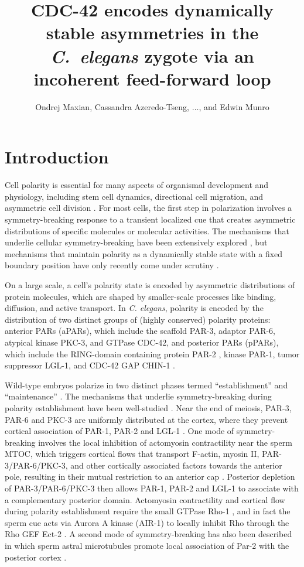 \documentclass[11pt]{article}
\title{CDC-42 encodes dynamically stable asymmetries in the \emph{C.\ elegans} zygote via an incoherent feed-forward loop}
\author{Ondrej Maxian, Cassandra Azeredo-Tseng, $\dots$, and Edwin Munro \vspace{-0.75 cm}}
\newcommand{\6}[1]{#1_{\text{6}}}
\newcommand{\3}[1]{#1_{\text{3}}}
\begin{document}
\maketitle

\section*{Introduction}
Cell polarity is essential for many aspects of organismal development and physiology, including stem cell dynamics, directional cell migration, and asymmetric cell division \citep{dewey2015cell, goldstein2007proteins, ierushalmi2021cytoskeletal, maitre2016asymmetric}. For most cells, the first step in polarization involves a symmetry-breaking response to a transient localized cue that creates asymmetric distributions of specific molecules or molecular activities. The mechanisms that underlie cellular symmetry-breaking have been extensively explored \citep{li2010symmetry}, but mechanisms that maintain polarity as a dynamically stable state with a fixed boundary position have only recently come under scrutiny \citep{sailer2015dynamic, gross2019guiding}.

On a large scale, a cell's polarity state is encoded by asymmetric distributions of protein molecules, which are shaped by smaller-scale processes like binding, diffusion, and active transport. In \emph{C. elegans}, polarity is encoded by the distribution of two distinct groups of (highly conserved) polarity proteins: anterior PARs (aPARs), which include the scaffold PAR-3, adaptor PAR-6, atypical kinase PKC-3, and GTPase CDC-42, and posterior PARs (pPARs), which include the RING-domain containing protein PAR-2 \citep{bland2023optimized}, kinase PAR-1, tumor suppressor LGL-1, and CDC-42 GAP CHIN-1 \citep{lang2017proteins}. 

Wild-type embryos polarize in two distinct phases termed ``establishment'' and ``maintenance'' \citep{cuenca2003polarization}. The mechanisms that underlie symmetry-breaking during polarity establishment have been well-studied \citep{cowan2007acto, munro2009cellular}.  Near the end of meiosis, PAR-3, PAR-6 and PKC-3 are uniformly distributed at the cortex, where they prevent cortical association of PAR-1, PAR-2 and LGL-1 \citep{schonegg2006cdc, others}.  One mode of symmetry-breaking involves the local inhibition of actomyosin contractility near the sperm MTOC, which triggers cortical flows that transport F-actin, myosin II, PAR-3/PAR-6/PKC-3, and other cortically associated factors towards the anterior pole, resulting in their mutual restriction to an anterior cap \citep{munro2004cortical, rodriguez2017apkc}. Posterior depletion of PAR-3/PAR-6/PKC-3 then allows PAR-1, PAR-2 and LGL-1 to associate with a complementary posterior domain.  Actomyosin contractility and cortical flow during polarity establishment require the small GTPase Rho-1 \citep{schonegg2006cdc, motegi2006sequential}, and in fact the sperm cue acts via Aurora A kinase (AIR-1) to locally inhibit Rho through the Rho GEF Ect-2 \citep{motegi2006sequential, tse2012rhoa, longhini2022aurora, kapoor2019centrosome}.  A second mode of symmetry-breaking has also been described in which sperm astral microtubules promote local association of Par-2 with the posterior cortex \citep{motegi2011microtubules}.
\end{document}
